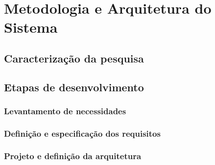 
\chapter{Metodologia e Arquitetura do Sistema}
\label{chap:metodologia-arquitetura}


\section{Caracterização da pesquisa}
\label{sec:caracterizacao-pesquisa}


\section{Etapas de desenvolvimento}
\label{sec:etapas-desenvolvimento}


\subsection{Levantamento de necessidades}
\label{subsec:levantamento-necessidades}


\subsection{Definição e especificação dos requisitos}
\label{subsec:especificacao-requisitos}


\subsection{Projeto e definição da arquitetura}
\label{subsec:projeto-arquitetura}


